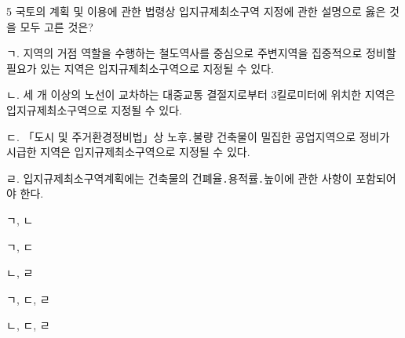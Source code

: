 \begin{question}{5}
국토의 계획 및 이용에 관한 법령상 입지규제최소구역 지정에 관한 설명으로 옳은 것을 모두 고른 것은?
\begin{framedtext}
ㄱ. 지역의 거점 역할을 수행하는 철도역사를 중심으로 주변지역을 집중적으로 정비할 필요가 있는 지역은 입지규제최소구역으로 지정될 수 있다. \par
ㄴ. 세 개 이상의 노선이 교차하는 대중교통 결절지로부터 3킬로미터에 위치한 지역은 입지규제최소구역으로 지정될 수 있다. \par
ㄷ. 「도시 및 주거환경정비법」상 노후․불량 건축물이 밀집한 공업지역으로 정비가 시급한 지역은 입지규제최소구역으로 지정될 수 있다. \par
ㄹ. 입지규제최소구역계획에는 건축물의 건폐율․용적률․높이에 관한 사항이 포함되어야 한다. \par
\end{framedtext}
\begin{choices}
  \item ㄱ, ㄴ
  \item ㄱ, ㄷ
  \item ㄴ, ㄹ
  \item ㄱ, ㄷ, ㄹ
  \item ㄴ, ㄷ, ㄹ
\end{choices}
\end{question}
